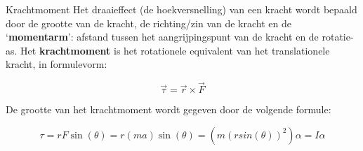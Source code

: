 \begin{theo}[Krachtmoment]{Krachtmoment}
    Het draaieffect (de hoekversnelling) van een kracht wordt bepaald door de grootte van de kracht, de richting/zin van de kracht en de `\textbf{momentarm}': afstand tussen het aangrijpingspunt van de kracht en de rotatie-as. Het \textbf{krachtmoment} is het rotationele equivalent van het translationele kracht, in formulevorm:

    \begin{equation*}
        \Vec{\tau} = \Vec{r} \times \Vec{F}
    \end{equation*}

    \noindent De grootte van het krachtmoment wordt gegeven door de volgende formule:

    \begin{equation*}
       \tau = rF\sin(\theta) = r(ma)\sin(\theta) = (m(r sin(\theta))^2)\alpha = I\alpha
    \end{equation*}


\end{theo}

